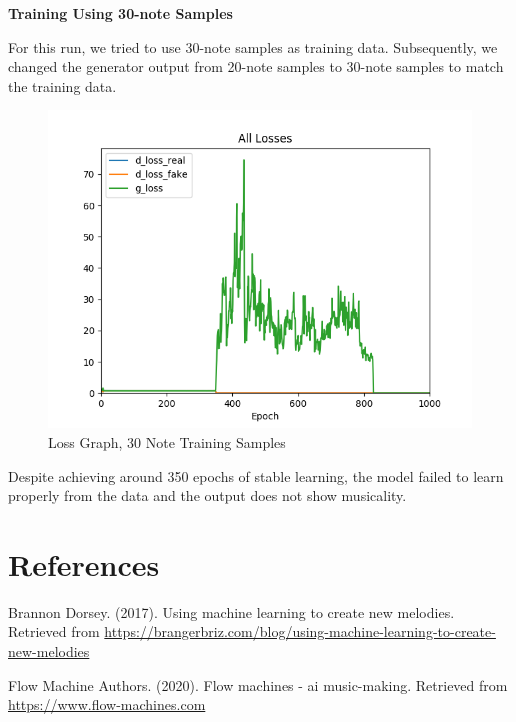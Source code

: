 \documentclass[12pt,oneside]{chicagocapstone}
\begin{document}
\textbf{Training Using 30-note Samples}

For this run, we tried to use 30-note samples as training data. Subsequently, we changed the generator output from 20-note samples to 30-note samples to match the training data.
\begin{figure}

{\centering \includegraphics[width=0.8\linewidth]{figure/ap_30notes} 

}

\caption{Loss Graph, 30 Note Training Samples}\label{fig:unnamed-chunk-14}
\end{figure}
Despite achieving around 350 epochs of stable learning, the model failed to learn properly from the data and the output does not show musicality.

\backmatter

\hypertarget{references}{%
\chapter*{References}\label{references}}


\noindent

\setlength{\parindent}{-0.20in}
\setlength{\leftskip}{0.20in}
\setlength{\parskip}{8pt}

\hypertarget{refs}{}
\leavevmode\hypertarget{ref-dorsey2017}{}%
Brannon Dorsey. (2017). Using machine learning to create new melodies. Retrieved from \url{https://brangerbriz.com/blog/using-machine-learning-to-create-new-melodies}

\leavevmode\hypertarget{ref-flow_machines}{}%
Flow Machine Authors. (2020). Flow machines - ai music-making. Retrieved from \url{https://www.flow-machines.com}
\end{document}
